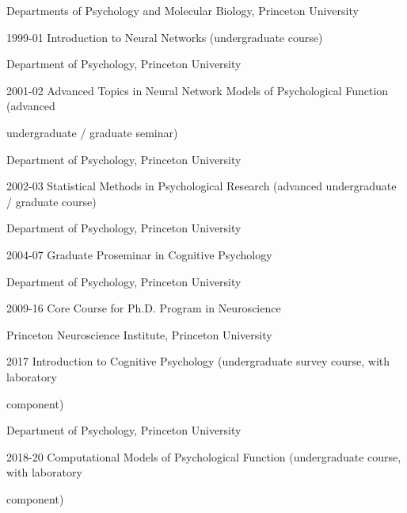 \documentclass[10 pt]{article}
\begin{document}
\hspace{0.81in} Departments of Psychology and Molecular Biology, Princeton University
    \smallskip

1999-01 \hspace{0.3in} Introduction to Neural Networks (undergraduate course)

\hspace{0.81in} Department of Psychology, Princeton University
    \smallskip

2001-02 \hspace{0.3in} Advanced Topics in Neural Network Models of Psychological Function (advanced

\hspace{0.81in} undergraduate / graduate seminar)

\hspace{0.81in} Department of Psychology, Princeton University
    \smallskip

2002-03 \hspace{0.3in} Statistical Methods in Psychological Research (advanced undergraduate / graduate course)

\hspace{0.81in} Department of Psychology, Princeton University
    \smallskip

2004-07 \hspace{0.3in} Graduate Proseminar in Cognitive Psychology

\hspace{0.81in} Department of Psychology, Princeton University
    \smallskip

2009-16 \hspace{0.3in} Core Course for Ph.D. Program in Neuroscience

\hspace{0.81in} Princeton Neuroscience Institute, Princeton University
    \smallskip

2017 \hspace{0.48in} Introduction to Cognitive Psychology (undergraduate survey course, with laboratory

\hspace{0.81in} component)

\hspace{0.81in} Department of Psychology, Princeton University
    \smallskip

2018-20 \hspace{0.3in} Computational Models of Psychological Function (undergraduate course, with laboratory

\hspace{0.81in} component)
\end{document}
